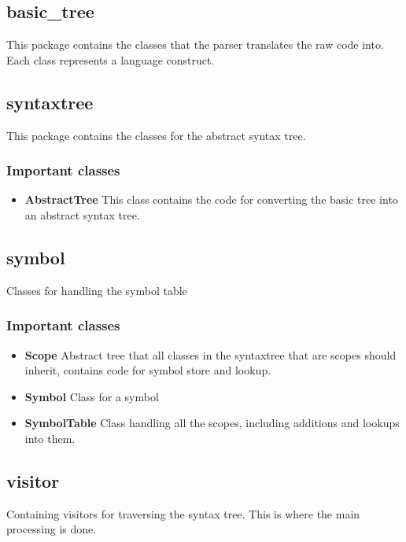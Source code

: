 \documentclass[a4paper,11pt]{article}
\begin{document}
   \subsection{basic\_tree}
      This package contains the classes that the parser translates the raw code into. Each class represents a language construct.
   \subsection{syntaxtree}
      This package contains the classes for the abstract syntax tree.
      \subsubsection{Important classes}
         \begin{itemize}
            \item \textbf{AbstractTree} This class contains the code for converting the basic tree into an abstract syntax tree.
         \end{itemize}
   \subsection{symbol}
      Classes for handling the symbol table
      \subsubsection{Important classes}
         \begin{itemize}
            \item \textbf{Scope} Abstract tree that all classes in the syntaxtree that are scopes should inherit, contains code for symbol store and lookup.
            \item \textbf{Symbol} Class for a symbol
            \item \textbf{SymbolTable} Class handling all the scopes, including additions and lookups into them.
         \end{itemize}
   \subsection{visitor}
      Containing visitors for traversing the syntax tree. This is where the main processing is done. 
\end{document}
